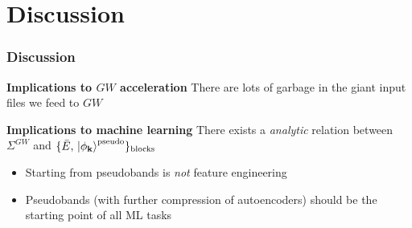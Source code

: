 \documentclass[t,aspectratio=169]{beamer}
\begin{document}
\section{Discussion}

\begin{frame}
\frametitle{Discussion}
    
\textbf{Implications to $GW$ acceleration} There are lots of garbage in the giant input files we feed to $GW$

\textbf{Implications to machine learning} There exists a \emph{analytic} relation between $\Sigma^{GW}$ and $\{\bar{E}, \ket*{\phi_{\vb{k}}}^{\text{pseudo}} \}_{\text{blocks}}$

\begin{itemize}
    \item Starting from pseudobands is \emph{not} feature engineering
    \item Pseudobands (with further compression of autoencoders) should be the starting point of all ML tasks
\end{itemize}

\end{frame}
\end{document}
